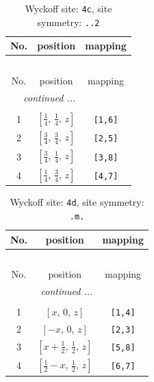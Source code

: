 \documentclass[fleqn,8pt]{jsarticle}
\begin{document}
\begin{longtable}{ccc}
\caption{Wyckoff site: {\tt 4c}, site symmetry: {\tt ..2}}
 \\
 \hline \hline
No. & position & mapping \\ \hline \endfirsthead

\multicolumn{2}{l}{\tablename\ \thetable{}} \\
 \hline \hline
No. & position & mapping \\ \hline \endhead

 \hline \hline
\multicolumn{2}{r}{\footnotesize\it continued ...} \\ \endfoot

 \hline \hline
\multicolumn{2}{r}{} \\ \endlastfoot

1 & $\left[ \frac{1}{4},\, \frac{1}{4},\, z \right]$ & {\tt [1,6]} \\ \hline
2 & $\left[ \frac{3}{4},\, \frac{3}{4},\, z \right]$ & {\tt [2,5]} \\ \hline
3 & $\left[ \frac{3}{4},\, \frac{1}{4},\, z \right]$ & {\tt [3,8]} \\ \hline
4 & $\left[ \frac{1}{4},\, \frac{3}{4},\, z \right]$ & {\tt [4,7]} \\
\end{longtable}
\renewcommand{\arraystretch}{1.2}
\begin{longtable}{ccc}
\caption{Wyckoff site: {\tt 4d}, site symmetry: {\tt .m.}}
 \\
 \hline \hline
No. & position & mapping \\ \hline \endfirsthead

\multicolumn{2}{l}{\tablename\ \thetable{}} \\
 \hline \hline
No. & position & mapping \\ \hline \endhead

 \hline \hline
\multicolumn{2}{r}{\footnotesize\it continued ...} \\ \endfoot

 \hline \hline
\multicolumn{2}{r}{} \\ \endlastfoot

1 & $\left[ x,\, 0,\, z \right]$ & {\tt [1,4]} \\ \hline
2 & $\left[ - x,\, 0,\, z \right]$ & {\tt [2,3]} \\ \hline
3 & $\left[ x + \frac{1}{2},\, \frac{1}{2},\, z \right]$ & {\tt [5,8]} \\ \hline
4 & $\left[ \frac{1}{2} - x,\, \frac{1}{2},\, z \right]$ & {\tt [6,7]} \\
\end{longtable}
\end{document}
